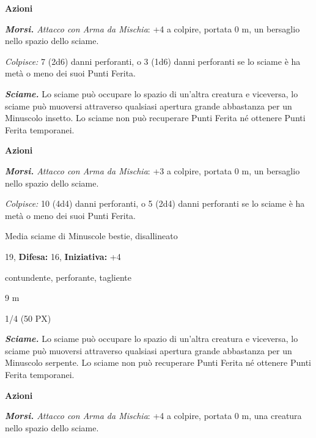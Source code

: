 \begin{multicols}{2}
{\textbf{Azioni}

\emph{\textbf{Morsi.} Attacco con Arma da Mischia}: +4 a colpire, portata 0 m, un bersaglio nello spazio dello sciame.

\emph{Colpisce:} 7 (2d6) danni perforanti, o 3 (1d6) danni perforanti se lo sciame è ha metà o meno dei suoi Punti Ferita.

\emph{\textbf{Sciame.}} Lo sciame può occupare lo spazio di un'altra creatura e viceversa, lo sciame può muoversi attraverso qualsiasi apertura grande abbastanza per un Minuscolo insetto. Lo sciame non può recuperare Punti Ferita né ottenere Punti Ferita temporanei.

\textbf{Azioni}

\emph{\textbf{Morsi.} Attacco con Arma da Mischia}: +3 a colpire, portata 0 m, un bersaglio nello spazio dello sciame.

\emph{Colpisce:} 10 (4d4) danni perforanti, o 5 (2d4) danni perforanti se lo sciame è ha metà o meno dei suoi Punti Ferita.

\begin{description}[noitemsep, topsep=0pt, parsep=0pt, partopsep=0pt, leftmargin=0cm, labelwidth=2.2cm]
    \item[\textbf{Taglia/Tipo:}] Media sciame di Minuscole bestie, disallineato
    \item[\textbf{Caratt.:}] 
    \item[\textbf{Punti Ferita:}] 19,  \textbf{Difesa:} 16,  \textbf{Iniziativa:} +4
    \item[\textbf{Resistenze al danno:}] contundente, perforante, tagliente
    \item[\textbf{Tiri Salvez.:}] 
    \item[\textbf{Movimento:}] 9 m
    \item[\textbf{Sfida:}] 1/4 (50 PX)\smallskip
\end{description}

\emph{\textbf{Sciame.}} Lo sciame può occupare lo spazio di un'altra creatura e viceversa, lo sciame può muoversi attraverso qualsiasi apertura grande abbastanza per un Minuscolo serpente. Lo sciame non può recuperare Punti Ferita né ottenere Punti Ferita temporanei.

\textbf{Azioni}

\emph{\textbf{Morsi.} Attacco con Arma da Mischia}: +4 a colpire, portata 0 m, una creatura nello spazio dello sciame.

}
\end{multicols}
